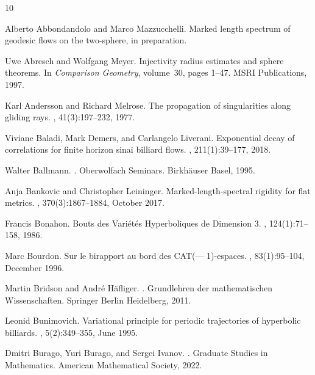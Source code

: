 \documentclass[reqno,11pt]{amsart}
\begin{document}
\begin{thebibliography}{10}

Alberto Abbondandolo and Marco Mazzucchelli.
\newblock Marked length spectrum of geodesic flows on the two-sphere, in preparation.

Uwe Abresch and Wolfgang Meyer.
\newblock Injectivity radius estimates and sphere theorems.
\newblock In {\em Comparison Geometry}, volume~30, pages 1--47. MSRI Publications, 1997.

Karl Andersson and Richard Melrose.
\newblock The propagation of singularities along gliding rays.
, 41(3):197--232, 1977.

Viviane Baladi, Mark Demers, and Carlangelo Liverani.
\newblock Exponential decay of correlations for finite horizon sinai billiard flows.
, 211(1):39--177, 2018.

Walter Ballmann.
.
\newblock Oberwolfach Seminars. Birkh{\"a}user Basel, 1995.

Anja Bankovic and Christopher Leininger.
\newblock Marked-length-spectral rigidity for flat metrics.
, 370(3):1867--1884, October 2017.

Francis Bonahon.
\newblock Bouts des {Variétés} {Hyperboliques} de {Dimension} 3.
, 124(1):71--158, 1986.

Marc Bourdon.
\newblock Sur le birapport au bord des {CAT}(— 1)-espaces.
, 83(1):95--104, December 1996.

Martin Bridson and Andr\'e H{\"a}fliger.
.
\newblock Grundlehren der mathematischen Wissenschaften. Springer Berlin Heidelberg, 2011.

Leonid Bunimovich.
\newblock Variational principle for periodic trajectories of hyperbolic billiards.
, 5(2):349--355, June 1995.

Dmitri Burago, Yuri Burago, and Sergei Ivanov.
.
\newblock Graduate Studies in Mathematics. American Mathematical Society, 2022.


\end{thebibliography}
\end{document}
